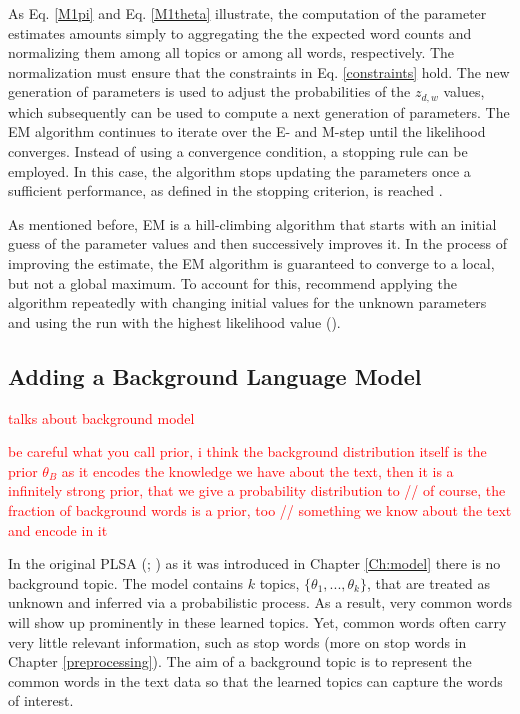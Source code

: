 \documentclass[11pt,a4paper,english,oneside]{book}
\numberwithin{equation}{chapter}
\begin{document}
As Eq. \ref{M1pi} and Eq. \ref{M1theta} illustrate, the computation of the parameter estimates amounts simply to aggregating the the expected word counts and normalizing them among all topics or among all words, respectively. The normalization must ensure that the constraints in Eq. \ref{constraints} hold. The new generation of parameters is used to adjust the probabilities of the $z_{d,w}$ values, which subsequently can be used to compute a next generation of parameters. The EM algorithm continues to iterate over the E- and M-step until the likelihood converges. Instead of using a convergence condition, a stopping rule can be employed. In this case, the algorithm stops updating the parameters once a sufficient performance, as defined in the stopping criterion, is reached \citep[p. 182--183]{Hofmann.2001}. 

As mentioned before, EM is a hill-climbing algorithm that starts with an initial guess of the parameter values and then successively improves it. In the process of improving the estimate, the EM algorithm is guaranteed to converge to a local, but not a global maximum. To account for this, \citeauthor{Zhai.2016} recommend applying the algorithm repeatedly with changing initial values for the unknown parameters and using the run with the highest likelihood value (\citeyear[p. 363--368]{Zhai.2016}).

\subsection{Adding a Background Language Model}\label{Ch:background}

\textcolor{red}{\cite{Darling.2011} talks about background model}

\textcolor{red}{be careful what you call prior, i think the background distribution itself is the prior $\theta_B$ as it encodes the knowledge we have about the text, then it is a infinitely strong prior, that we give a probability distribution to // of course, the fraction of background words is a prior, too // something we know about the text and encode in it}

In the original PLSA (\citealp{Hofmann.1999}; \citeyear{Hofmann.2001}) as it was introduced in Chapter \ref{Ch:model} there is no background topic. The model contains $k$ topics, $\{\theta_1, ..., \theta_k\}$, that are treated as unknown and inferred via a probabilistic process. As a result, very common words will show up prominently in these learned topics. Yet, common words often carry very little relevant information, such as stop words (more on stop words in Chapter \ref{preprocessing}). 
The aim of a background topic is to represent the common words in the text data so that the learned topics can capture the words of interest. 
\end{document}
